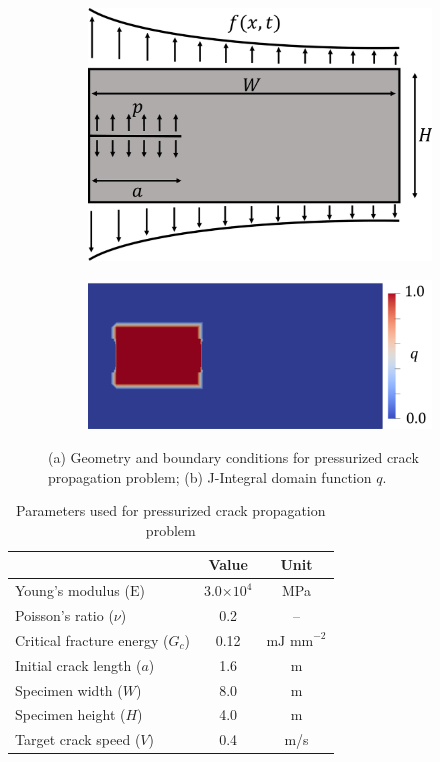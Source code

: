 \begin{figure}[h]
\begin{subfigure}{.49\textwidth}
  \centering
  \includegraphics[width=0.8\linewidth]{images/2d_propagation/surfing_schematic.pdf}
  \caption{}
  \label{fig:surfing_schematic}
\end{subfigure}%
\begin{subfigure}{.49\textwidth}
  \centering
  \vspace{1.06cm}
  \includegraphics[width=0.8\linewidth]{images/2d_propagation/q_field_legend.png}
  \vspace{1.06cm}
  \caption{}
  \label{fig:integration_domain}
\end{subfigure}%
  \caption{(a) Geometry and boundary conditions for pressurized crack propagation problem; (b) J-Integral domain function $q$. } 
  \label{fig:surfing_problem_setup}
\end{figure}

\begin{table}[h]
\centering
\caption{Parameters used for pressurized crack propagation problem}
\begin{tabular}[t]{lcc}
\hline
&Value &Unit \\
\hline
Young's modulus ($\text{E}$)&3.0$\times10^4$&MPa\\
Poisson's ratio ($\nu$)&0.2&--\\
Critical fracture energy  ($G_c$)&0.12&$\text{mJ mm}^{-2}$\\
Initial crack length ($a$)&1.6&m\\
Specimen width ($W$)&8.0&m\\
Specimen height ($H$)&4.0&m\\
Target crack speed ($V$)&0.4&m/s\\
\hline
\end{tabular}\label{material_properties_propagation}
\end{table}

